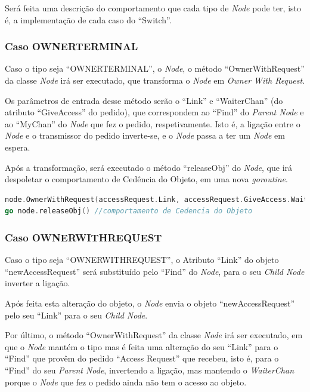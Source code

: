 Será feita uma descrição do comportamento que cada tipo de \emph{Node} pode ter,
isto é, a implementação de cada caso do ``Switch''.

\subsubsection*{Caso OWNER\textunderscore TERMINAL}
Caso o tipo seja ``OWNER\textunderscore TERMINAL'', o \emph{Node}, o método ``OwnerWithRequest'' da classe \emph{Node} irá ser executado, que transforma o 
\emph{Node} em \emph{Owner With Request}.

Os parâmetros de entrada desse método serão o ``Link'' e ``WaiterChan'' (do atributo ``GiveAccess'' do pedido), que correspondem ao ``Find'' do \emph{Parent Node} e ao ``MyChan'' do \emph{Node} que fez o pedido, respetivamente.
Isto é, a ligação entre o \emph{Node} e o transmissor do pedido inverte-se, e o \emph{Node} passa a ter um \emph{Node} em espera.

Após a transformação, será executado o método ``releaseObj'' do \emph{Node}, que irá despoletar o comportamento de Cedência do Objeto, em uma nova \emph{goroutine}.


\begin{lstlisting}[caption={Comportamento do \emph{Node} tipo \emph{Owner Terminal} caso receba um pedido \emph{Access Request} no \emph{Channel ``Find''}},language=Go]
node.OwnerWithRequest(accessRequest.Link, accessRequest.GiveAccess.WaiterChan) // transfomacao em Owner With Request
go node.releaseObj() //comportamento de Cedencia do Objeto
\end{lstlisting}



\subsubsection*{Caso OWNER\textunderscore WITH\textunderscore REQUEST}
Caso o tipo seja ``OWNER\textunderscore WITH\textunderscore REQUEST'',
o Atributo ``Link'' do objeto ``newAccessRequest'' será substituído pelo ``Find'' do \emph{Node}, para o seu \emph{Child Node} inverter a ligação.

Após feita esta alteração do objeto, o \emph{Node} envia o objeto ``newAccessRequest'' pelo seu ``Link'' para o seu \emph{Child Node}.

Por último, o método ``OwnerWithRequest'' da classe \emph{Node} irá ser executado, em que o \emph{Node} mantém o tipo mas
é feita uma alteração do seu ``Link'' para o ``Find'' que provêm do pedido ``Access Request'' que recebeu, isto é, para o ``Find'' do seu \emph{Parent Node}, 
invertendo a ligação,
mas mantendo o \emph{WaiterChan} porque o \emph{Node} que fez o pedido ainda não tem o acesso ao objeto.


